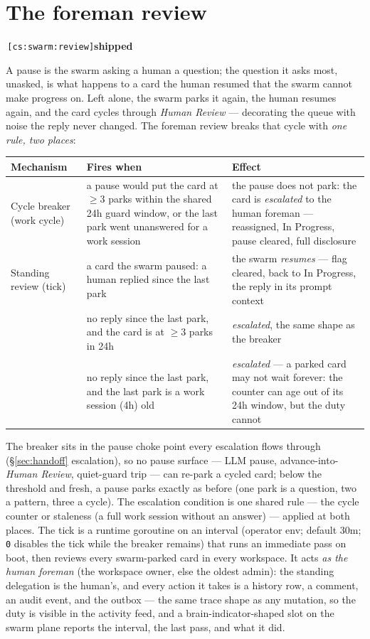 \documentclass[11pt,a4paper]{report}
\newcommand{\cs}[1]{\,\texttt{\scriptsize[cs:#1]}\label{cs:#1}}
\newcommand{\shipped}{\textbf{\textcolor{green!45!black}{shipped}}}
\begin{document}
\section{The foreman review}
\label{sec:review}
\cs{swarm:review}\shipped\

A pause is the swarm asking a human a question; the question it asks
most, unasked, is what happens to a card the human resumed that the
swarm cannot make progress on. Left alone, the swarm parks it again,
the human resumes again, and the card cycles through \emph{Human
Review} --- decorating the queue with noise the reply never changed.
The foreman review breaks that cycle with \emph{one rule, two
places}:

\begin{center}
\begin{tabular}{@{}p{}p{}p{}@{}}
\toprule
\textbf{Mechanism} & \textbf{Fires when} & \textbf{Effect}\\
\midrule
Cycle breaker (work cycle) & a pause would put the card at $\ge 3$ parks
  within the shared 24h guard window, or the last park went
  unanswered for a work session & the pause does not park: the card
  is \emph{escalated} to the human foreman --- reassigned, In
  Progress, pause cleared, full disclosure\\
Standing review (tick) & a card the swarm paused: a human replied
  since the last park & the swarm \emph{resumes} --- flag cleared,
  back to In Progress, the reply in its prompt context\\
 & no reply since the last park, and the card is at $\ge 3$ parks
  in 24h & \emph{escalated}, the same shape as the breaker\\
 & no reply since the last park, and the last park is a work
  session (4h) old & \emph{escalated} --- a parked card may not wait
  forever: the counter can age out of its 24h window, but the duty
  cannot\\
\bottomrule
\end{tabular}
\end{center}

The breaker sits in the pause choke point every escalation flows
through (\S\ref{sec:handoff} escalation), so no pause surface --- LLM
pause, advance-into-\emph{Human Review}, quiet-guard trip --- can
re-park a cycled card; below the threshold and fresh, a pause parks
exactly as before (one park is a question, two a pattern, three a
cycle). The escalation condition is one shared rule --- the cycle
counter or staleness (a full work session without an answer) ---
applied at both places. The
tick is a runtime goroutine on an interval (operator env; default
30m; \texttt{0} disables the tick while the breaker remains) that runs
an immediate pass on boot, then reviews every swarm-parked card in
every workspace. It acts \emph{as the human foreman} (the workspace
owner, else the oldest admin): the standing delegation is the human's,
and every action it takes is a history row, a comment, an audit event,
and the outbox --- the same trace shape as any mutation, so the duty
is visible in the activity feed, and a brain-indicator-shaped slot on
the swarm plane reports the interval, the last pass, and what it did.
\end{document}
